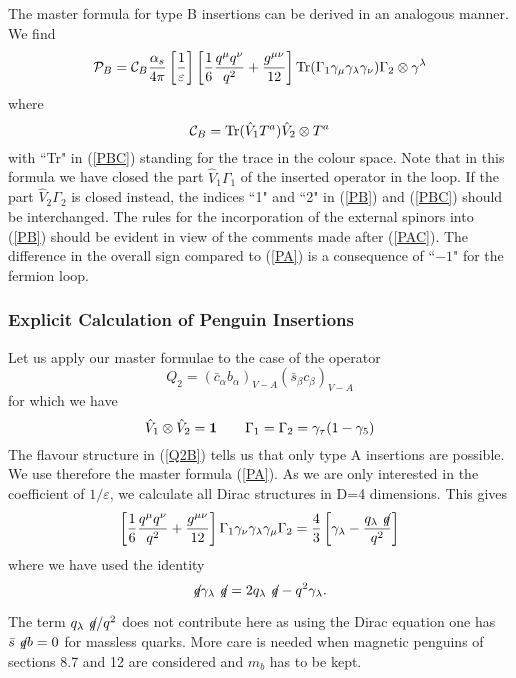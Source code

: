\documentclass[12pt]{article}
\def\as{\alpha_s}
\newcommand{\be}{\begin{equation}}
\newcommand{\ee}{\end{equation}}
\begin{document}
\begin{itemize}
\begin{itemize}
The master formula for type B insertions can be derived in an
analogous manner. We find 
\be\label{PB}
{\cal P}_B= {\cal C}_B \frac{\as}{4\pi} 
\left[\frac{1}{\varepsilon}\right]
\left[\frac{1}{6}\frac{q^\mu q^\nu}{q^2}+\frac{g^{\mu\nu}}{12}\right]
{\rm Tr}
(\Gamma_1\gamma_\mu\gamma_\lambda\gamma_\nu)\Gamma_2\otimes \gamma^\lambda
\ee
where
\be\label{PBC}
{\cal C}_B={\rm Tr}(\hat V_1 T^a)\hat V_2\otimes T^a
\ee
with ``Tr" in (\ref{PBC}) standing for the trace in the colour space.
Note that in this formula we have closed the part $\hat V_1\Gamma_1$
of the inserted operator in the loop. If the part $\hat V_2\Gamma_2$
is closed instead, the indices ``1" and ``2" in (\ref{PB}) and
(\ref{PBC}) should be interchanged. The rules for the incorporation
of the external spinors into (\ref{PB}) should be evident in view of the
comments made after (\ref{PAC}). The difference in the overall sign
compared to (\ref{PA}) is a consequence of ``$-1$" for the fermion loop.

\subsubsection{Explicit Calculation of Penguin Insertions}
Let us apply our master formulae to the case of the operator
\be\label{Q2B}
Q_2=(\bar c_\alpha b_\alpha)_{V-A} (\bar s_\beta c_\beta)_{V-A}
\ee
for which we have
\be\label{DICO}
\hat V_1\otimes \hat V_2={\bf 1} \quad\quad 
\Gamma_1=\Gamma_2=\gamma_\tau(1-\gamma_5)
\ee
The flavour structure in (\ref{Q2B}) tells us that only type A insertions
are possible. We use therefore the master formula (\ref{PA}).
As we are only interested in the coefficient of $1/\varepsilon$,
we calculate all Dirac structures in D=4 dimensions. This gives
\be\label{DIRA}
\left[\frac{1}{6}\frac{q^\mu q^\nu}{q^2}+\frac{g^{\mu\nu}}{12}\right]
\Gamma_1\gamma_\nu\gamma_\lambda\gamma_\mu\Gamma_2=
\frac{4}{3}\left[\gamma_\lambda-\frac{q_\lambda\not\! q}{q^2}\right]
\ee
where we have used the identity
\be
\not\! q \gamma_\lambda \not\! q=2 q_\lambda \not\! q-q^2\gamma_\lambda.
\ee

The term $q_\lambda\not\! q/q^2$ does not contribute here as using
the Dirac equation one has $\bar s\not\! q b=0$ for massless quarks. 
More
care is needed when magnetic penguins of sections 8.7 and 12 are considered
and $m_b$ has to be kept.


\end{itemize}
\end{itemize}
\end{document}
